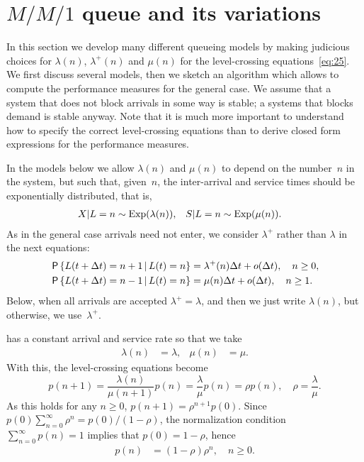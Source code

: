 \documentclass[stochastic-or.tex]{subfiles}
\begin{document}
\section{\texorpdfstring{$M/M/1$}{MM1} queue and its variations}
\label{sec:mm1}


In this section we develop many different queueing models by making judicious choices for $\lambda(n)$, $\lambda^{+}(n)$ and $\mu(n)$ for the level-crossing equations~\cref{eq:25}.
We first discuss several models, then we sketch an algorithm which allows to compute the performance measures for the general case.
We assume that a system that does not block arrivals in some way is stable; a systems that blocks demand is stable anyway.
Note that it is much more important to understand how to specify the correct level-crossing equations than to derive closed form expressions for the performance measures.

In the models below we allow $\lambda(n)$ and $\mu(n)$ to depend on the number~$n$ in the system, but such that, given~$n$, the inter-arrival and service times should be exponentially distributed, that is,
\begin{align*}
  X|L=n &\sim \mathrm{Exp}(\lambda(n)), & S|L=n &\sim \mathrm{Exp}(\mu(n)).
\end{align*}
As  in the general case arrivals need not enter, we consider $\lambda^{+}$ rather than $\lambda$ in the next equations:
\begin{align*}
  \,\mathsf{P}\left\{L(t+\Delta t) = n+1 \,\middle|\, L(t) = n \right\} &= \lambda^{+}(n) \Delta t + o(\Delta t), \quad n\geq 0,\\
  \,\mathsf{P}\left\{L(t+\Delta t) = n-1 \,\middle|\, L(t) = n \right\} &= \mu(n) \Delta t + o(\Delta t), \quad n \geq 1.
\end{align*}
Below, when all arrivals are accepted $\lambda^{+} = \lambda$, and then we just write $\lambda(n)$, but otherwise, we use~$\lambda^{+}$.


 has  a constant arrival and service rate so that we take
\begin{align*}
\lambda(n)&=\lambda, & \mu(n)&=\mu.
\end{align*}
With this, the level-crossing equations become
\begin{equation*}
 p(n+1) = \frac{\lambda(n)}{\mu(n+1)} p(n) = \frac{\lambda}{\mu} p(n) = \rho p(n),\quad \rho = \frac{\lambda}{\mu}.
\end{equation*}
As this holds for any $n\geq 0$, $p(n+1) = \rho^{n+1} p(0)$. Since $p(0) \sum_{n=0}^{\infty} \rho^{n} = p(0)/(1-\rho)$, the normalization condition $\sum_{n=0}^{\infty} p(n) = 1$ implies that $p(0) = 1-\rho$, hence
\begin{align}\label{eq:23}
p(n) &= (1-\rho)\rho^{n}, \quad n \geq 0.
\end{align}
\end{document}
